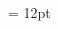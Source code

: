 \documentclass[gps1,twoside]{article}
\begin{document}
\begin{spacing}{0.916666666666667}
\begin{center}
\begin{center}
 \label{PageStock_HangingIndent2} \end{center}
\end{center}\end{spacing}\setlength{\columnsep}{12pt} 
\setlength\columnseprule{0.4pt} 
\begin{multicols}{2}\begin{spacing}{0.458333333333333}{\raggedright} \begin{spacing}{0.458333333333333}
\hangindent= 12pt
 \headwordafterentryletDatadicBody{}\spanenpronunciationggofonipaxemicspanentryletDatadicBody{[}\spanenpronunciationggofonipaxemicspanentryletDatadicBody{]}  \grammaticalinfoaftersensespanentryletDatadicBody{} \end{spacing}
 \end{spacing}\end{multicols}
\end{document}
